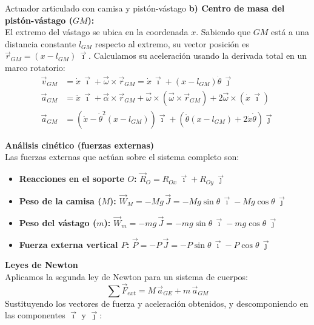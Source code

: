 \begin{solucion}{Actuador articulado con camisa y pistón-vástago}
\textbf{b) Centro de masa del pistón-vástago ($GM$):}\\
El extremo del vástago se ubica en la coordenada $x$. Sabiendo que $GM$ está a una distancia constante $l_{GM}$ respecto al extremo, su vector posición es $\vec{r}_{GM} = (x - l_{GM})\, \vec{\imath}$. Calculamos su aceleración usando la derivada total en un marco rotatorio:
\begin{align}
    \vec{v}_{GM} &= \dot{x}\, \vec{\imath} + \vec{\omega} \times \vec{r}_{GM} = \dot{x}\, \vec{\imath} + (x - l_{GM})\dot{\theta}\, \vec{\jmath} \\
    \vec{a}_{GM} &= \ddot{x}\, \vec{\imath} + \vec{\alpha} \times \vec{r}_{GM} + \vec{\omega} \times (\vec{\omega} \times \vec{r}_{GM}) + 2\vec{\omega} \times (\dot{x}\, \vec{\imath}) \nonumber \\
    \vec{a}_{GM} &= \left( \ddot{x} - \dot{\theta}^2(x - l_{GM}) \right) \vec{\imath} + \left( \ddot{\theta}(x - l_{GM}) + 2\dot{x}\dot{\theta} \right) \vec{\jmath}
\end{align}

\textbf{Análisis cinético (fuerzas externas)}\\

Las fuerzas externas que actúan sobre el sistema completo son:
\begin{itemize}
    \item \textbf{Reacciones en el soporte $O$:} $\vec{R}_O = R_{Ox}\, \vec{\imath} + R_{Oy}\, \vec{\jmath}$
    \item \textbf{Peso de la camisa ($M$):} $\vec{W}_M = -Mg\, \vec{J} = -Mg\sin\theta\, \vec{\imath} - Mg\cos\theta\, \vec{\jmath}$
    \item \textbf{Peso del vástago ($m$):} $\vec{W}_m = -mg\, \vec{J} = -mg\sin\theta\, \vec{\imath} - mg\cos\theta\, \vec{\jmath}$
    \item \textbf{Fuerza externa vertical $P$:} $\vec{P} = -P\, \vec{J} = -P\sin\theta\, \vec{\imath} - P\cos\theta\, \vec{\jmath}$
\end{itemize}

\textbf{Leyes de Newton}\\

Aplicamos la segunda ley de Newton para un sistema de cuerpos:
\begin{equation}
    \sum \vec{F}_{ext} = M\, \vec{a}_{GE} + m\, \vec{a}_{GM}
\end{equation}
Sustituyendo los vectores de fuerza y aceleración obtenidos, y descomponiendo en las componentes $\vec{\imath}$ y $\vec{\jmath}$:


\end{solucion}

